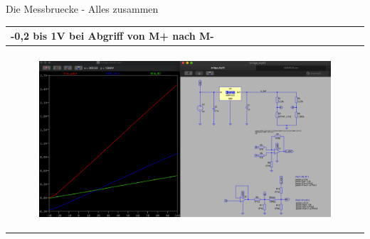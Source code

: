 \begin{frame}[t]{Die Messbruecke - Alles zusammen} 
    
    \begin{spacing}{0.9} \begin{tiny}
      \begin{table}[h!]
      \begin{tabular}{p{10cm} }
        \hline
        \textbf{-0,2 bis 1V bei Abgriff von M+ nach M-} \\
        \hline \\
        \begin{minipage}{\textwidth}  
            \begin{figure}
                \includegraphics[width=\linewidth]{pictures/complete.png}
            \end{figure}
        \end{minipage} 
    \end{tabular}

    \end{table}
     
    \end{tiny} \end{spacing}

\end{frame}
